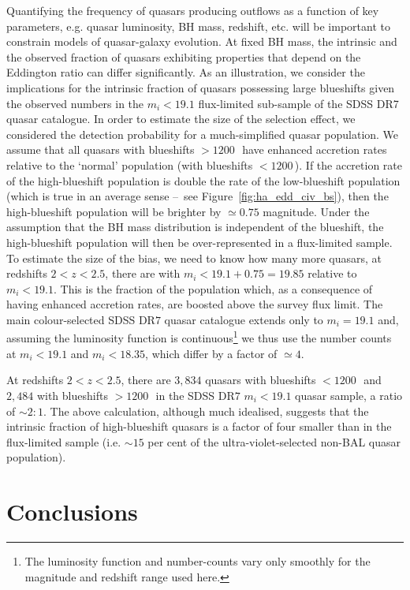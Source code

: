 Quantifying the frequency of quasars producing outflows as a function of key parameters, e.g. quasar luminosity, BH mass, redshift, etc. will be important to constrain models of quasar-galaxy evolution.  
At fixed BH mass, the intrinsic and the observed fraction of quasars exhibiting properties that depend on the Eddington ratio can differ significantly. 
As an illustration, we consider the implications for the intrinsic fraction of quasars possessing large  blueshifts given the observed numbers in the $m_i<19.1$ flux-limited sub-sample of the SDSS DR7 quasar catalogue. 
In order to estimate the size of the selection effect, we considered the detection probability for a much-simplified quasar population. 
We assume that all quasars with  blueshifts $>1200$\,\kms\, have enhanced accretion rates relative to the `normal' population (with  blueshifts $<1200$\,\kms). 
If the accretion rate of the high-blueshift population is double the rate of the low-blueshift population (which is true in an average sense \---\ see Figure~\ref{fig:ha_edd_civ_bs}), then the high-blueshift population will be brighter by $\simeq0.75$ magnitude.
Under the assumption that the BH mass distribution is independent of the  blueshift, the high-blueshift population will then be over-represented in a flux-limited sample.
To estimate the size of the bias, we need to know how many more quasars, at redshifts $2 < z < 2.5$, there are with $m_i<19.1+0.75=19.85$ relative to $m_i < 19.1$.
This is the fraction of the population which, as a consequence of having enhanced accretion rates, are boosted above the survey flux limit.    
The main colour-selected SDSS DR$7$ quasar catalogue extends only to $m_i= 19.1$ and, assuming the luminosity function is continuous\footnote{The luminosity function and number-counts vary only smoothly \citep[e.g.][]{ross13} for the magnitude and redshift range used here.} we thus use the number counts at $m_i < 19.1$ and $m_i < 18.35$, which differ by a factor of $\simeq 4$. 

At redshifts $2 < z <2.5$, there are $3,834$ quasars with  blueshifts $<1200$\,\kms\, and $2,484$ with blueshifts $>1200$\,\kms\, in the SDSS DR$7$ $m_i < 19.1$ quasar sample, a ratio of $\sim2:1$. 
The above calculation, although much idealised, suggests that the intrinsic fraction of high-blueshift quasars is a factor of four smaller than in the flux-limited sample (i.e. $\sim15$ per cent of the ultra-violet-selected non-BAL quasar population). 

\section{Conclusions}
\label{sec:conclusions}

